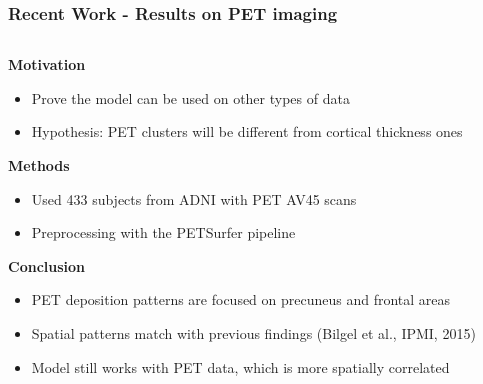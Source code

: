 \documentclass[8pt,xcolor=table]{beamer}
\begin{document}



\begin{frame}
\frametitle{Recent Work - Results on PET imaging}

\newcommand{\scalingFactor}{1}

\newcommand{\gradLimLeft}{-1.6}
\newcommand{\gradLimRight}{1.6}

\newcommand{\scalingFactorBrains}{1.0}
\newcommand{\scalingFactorTraj}{1}

\newcommand{\recentFigFold}{../../journal_paper/figures/}

\begin{columns}[T]
    \begin{column}{.55\textwidth}
    
    \vspace{3em}
    \textbf{Motivation}
    \begin{itemize}
      \item Prove the model can be used on other types of data
      \item Hypothesis: PET clusters will be different from cortical thickness ones
    \end{itemize}
    
    
    \textbf{Methods}
    \begin{itemize}
      \item Used 433 subjects from ADNI with PET AV45 scans
      \item Preprocessing with the PETSurfer pipeline
    \end{itemize}
    
    
    \textbf{Conclusion}
    \begin{itemize}
      \item PET deposition patterns are focused on precuneus and frontal areas
     \item Spatial patterns match with previous findings (Bilgel et al., IPMI, 2015)
     \item Model still works with PET data, which is more spatially correlated
    \end{itemize}
     
    \end{column}
    

\end{columns}
\end{frame}
\end{document}
